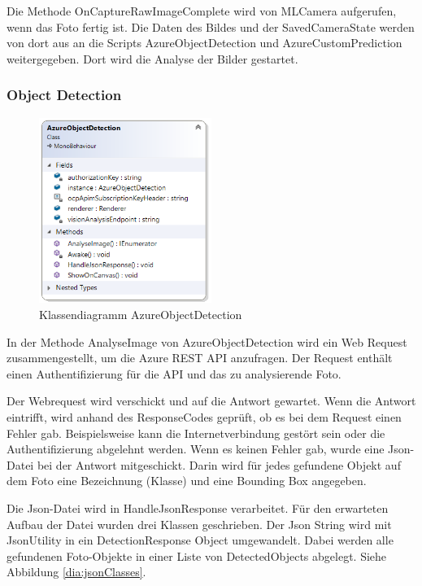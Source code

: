 Die Methode OnCaptureRawImageComplete wird von MLCamera aufgerufen, wenn das Foto fertig ist. Die Daten des Bildes und der SavedCameraState werden von dort aus an die Scripts AzureObjectDetection und AzureCustomPrediction weitergegeben. Dort wird die Analyse der Bilder gestartet. 

\subsubsection{Object Detection}

\begin{figure}[H]
	\centering
	\includegraphics[width=0.5\textwidth]{images/dia_azureobjectdetection.PNG}
	\caption[]{Klassendiagramm AzureObjectDetection}
	\label{dia:azureobjectdetection}
\end{figure}

In der Methode AnalyseImage von AzureObjectDetection wird ein Web Request zusammengestellt, um die Azure REST API anzufragen. Der Request enthält einen Authentifizierung für die API und das zu analysierende Foto. %

Der Webrequest wird verschickt und auf die Antwort gewartet. Wenn die Antwort eintrifft, wird anhand des ResponseCodes geprüft, ob es bei dem Request einen Fehler gab. Beispielsweise kann die Internetverbindung gestört sein oder die Authentifizierung abgelehnt werden.
Wenn es keinen Fehler gab, wurde eine Json-Datei bei der Antwort mitgeschickt. Darin wird für jedes gefundene Objekt auf dem Foto eine Bezeichnung (Klasse) und eine Bounding Box angegeben. 

Die Json-Datei wird in HandleJsonResponse verarbeitet. Für den erwarteten Aufbau der Datei wurden drei Klassen geschrieben. Der Json String wird mit JsonUtility in ein DetectionResponse Object umgewandelt. Dabei werden alle gefundenen Foto-Objekte in einer Liste von DetectedObjects abgelegt. Siehe Abbildung \ref{dia:jsonClasses}. \citep{fromjson}

